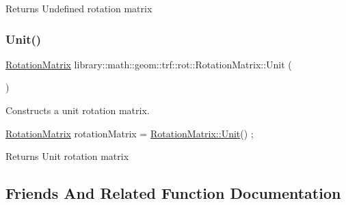 \begin{DoxyReturn}{Returns}
Undefined rotation matrix 
\end{DoxyReturn}
\mbox{\label{classlibrary_1_1math_1_1geom_1_1trf_1_1rot_1_1_rotation_matrix_aac59b7dafc34767d24d0934f4b86bef0}} 
\subsubsection{\texorpdfstring{Unit()}{Unit()}}
{\footnotesize\ttfamily \hyperlink{classlibrary_1_1math_1_1geom_1_1trf_1_1rot_1_1_rotation_matrix}{Rotation\+Matrix} library\+::math\+::geom\+::trf\+::rot\+::\+Rotation\+Matrix\+::\+Unit (\begin{DoxyParamCaption}{ }\end{DoxyParamCaption})\hspace{0.3cm}{\ttfamily [static]}}



Constructs a unit rotation matrix. 


\begin{DoxyCode}
\hyperlink{classlibrary_1_1math_1_1geom_1_1trf_1_1rot_1_1_rotation_matrix_a667d2c05aa5b0cc88775938d11164cdc}{RotationMatrix} rotationMatrix = \hyperlink{classlibrary_1_1math_1_1geom_1_1trf_1_1rot_1_1_rotation_matrix_aac59b7dafc34767d24d0934f4b86bef0}{RotationMatrix::Unit}() ;
\end{DoxyCode}


\begin{DoxyReturn}{Returns}
Unit rotation matrix 
\end{DoxyReturn}


\subsection{Friends And Related Function Documentation}
\mbox{\label{classlibrary_1_1math_1_1geom_1_1trf_1_1rot_1_1_rotation_matrix_aa9ed0897a6219331deeb7750017a0df9}} 
